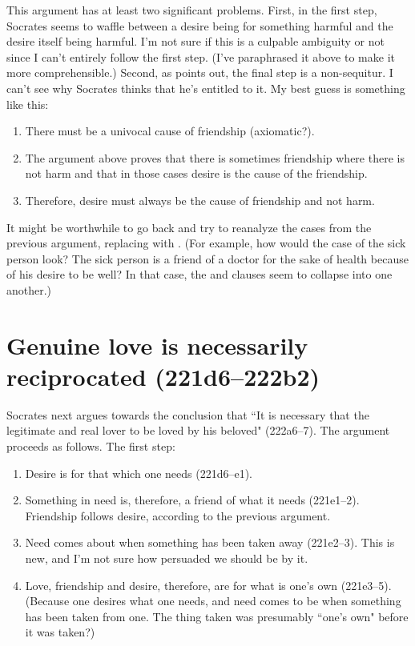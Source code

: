 \documentclass[11pt]{article}
\begin{document}
This argument has at least two significant problems.  First, in the first step, Socrates seems to waffle between a desire being for something harmful and the desire itself being harmful.  I'm not sure if this is a culpable ambiguity or not since I can't entirely follow the first step. (I've paraphrased it above to make it more comprehensible.)  Second, as \citet{watt1987} points out, the final step is a non-sequitur.  I can't see why Socrates thinks that he's entitled to it.  My best guess is something like this:

\begin{enumerate}
    \item There must be a univocal cause of friendship (axiomatic?).
    \item The argument above proves that there is sometimes friendship where there is not harm and that in those cases desire is the cause of the friendship.
    \item Therefore, desire must always be the cause of friendship and not harm.
\end{enumerate}

It might be worthwhile to go back and try to reanalyze the cases from the previous argument, replacing  with .  (For example, how would the case of the sick person look?  The sick person is a friend of a doctor for the sake of health because of his desire to be well?  In that case, the  and  clauses seem to collapse into one another.)


\section{Genuine love is necessarily reciprocated (221d6--222b2)}

Socrates next argues towards the conclusion that ``It is necessary that the legitimate and real lover to be loved by his beloved" (222a6--7).  The argument proceeds as follows.  The first step:

\begin{enumerate}
    \item Desire is for that which one needs (221d6--e1).
    \item Something in need is, therefore, a friend of what it needs (221e1--2).  Friendship follows desire, according to the previous argument.
    \item Need comes about when something has been taken away (221e2--3).  This is new, and I'm not sure how persuaded we should be by it.
    \item Love, friendship and desire, therefore, are for what is one's own (221e3--5).  (Because one desires what one needs, and need comes to be when something has been taken from one.  The thing taken was presumably ``one's own" before it was taken?)
\end{enumerate}
\end{document}
